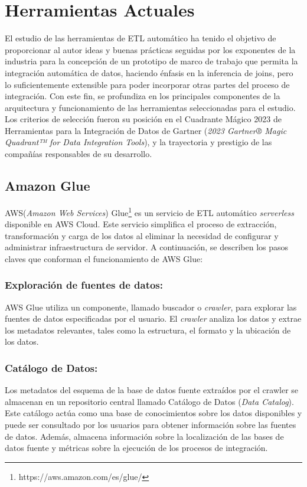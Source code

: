 \section{Herramientas Actuales} \label{section:actual_tools}

El estudio de las herramientas de ETL automático ha tenido el objetivo de proporcionar al autor ideas y buenas 
prácticas seguidas por los exponentes de la industria para la concepción de un prototipo de marco de 
trabajo que permita la integración automática de datos, haciendo énfasis en la inferencia de joins, pero lo 
suficientemente extensible para poder incorporar otras partes del proceso de integración. Con este fin, se 
profundiza en los principales componentes de la arquitectura y funcionamiento de las herramientas seleccionadas 
para el estudio. Los criterios de selección fueron su posición en el Cuadrante Mágico 2023 de Herramientas para 
la Integración de Datos de Gartner (\emph{2023 Gartner® Magic Quadrant™ for Data Integration Tools})\cite{magic_q}, y la 
trayectoria y prestigio de las compañías responsables de su desarrollo.

\subsection{Amazon Glue}

AWS(\emph{Amazon Web Services}) Glue\footnote{https://aws.amazon.com/es/glue/} es un servicio de ETL automático \emph{serverless} 
disponible en AWS Cloud. Este servicio simplifica el proceso de 
extracción, transformación y carga de los datos al eliminar la necesidad de configurar y administrar infraestructura de 
servidor. A continuación, se describen los pasos claves que conforman el funcionamiento de AWS Glue\cite{noauthor_aws_nodate}:

\subsubsection{Exploración de fuentes de datos:}
AWS Glue utiliza un componente, llamado buscador o \emph{crawler}, para explorar las fuentes de datos 
especificadas por el usuario. El \emph{crawler} analiza los datos y extrae los metadatos relevantes, tales como la estructura, el 
formato y la ubicación de los datos.

\subsubsection{Catálogo de Datos:}
Los metadatos del esquema de la base de datos fuente extraídos por el crawler se almacenan en un repositorio central llamado Catálogo de 
Datos (\emph{Data Catalog}). Este catálogo actúa como una base de conocimientos sobre los datos disponibles y puede ser 
consultado por los usuarios para obtener información sobre las fuentes de datos. Además, almacena información 
sobre la localizaci\'on de las bases de datos fuente y m\'etricas sobre la ejecución de los procesos 
de integración\cite{noauthor_aws_nodate}.


